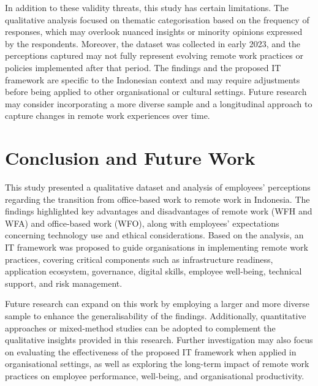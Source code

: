 \documentclass[a4paper, conference]{IEEEtran}
\begin{document}
In addition to these validity threats, this study has certain limitations. The qualitative analysis focused on thematic categorisation based on the frequency of responses, which may overlook nuanced insights or minority opinions expressed by the respondents. Moreover, the dataset was collected in early 2023, and the perceptions captured may not fully represent evolving remote work practices or policies implemented after that period. The findings and the proposed IT framework are specific to the Indonesian context and may require adjustments before being applied to other organisational or cultural settings. Future research may consider incorporating a more diverse sample and a longitudinal approach to capture changes in remote work experiences over time.


\section{Conclusion and Future Work}

This study presented a qualitative dataset and analysis of employees' perceptions regarding the transition from office-based work to remote work in Indonesia. The findings highlighted key advantages and disadvantages of remote work (WFH and WFA) and office-based work (WFO), along with employees' expectations concerning technology use and ethical considerations. Based on the analysis, an IT framework was proposed to guide organisations in implementing remote work practices, covering critical components such as infrastructure readiness, application ecosystem, governance, digital skills, employee well-being, technical support, and risk management.

Future research can expand on this work by employing a larger and more diverse sample to enhance the generalisability of the findings. Additionally, quantitative approaches or mixed-method studies can be adopted to complement the qualitative insights provided in this research. Further investigation may also focus on evaluating the effectiveness of the proposed IT framework when applied in organisational settings, as well as exploring the long-term impact of remote work practices on employee performance, well-being, and organisational productivity.




\end{document}
